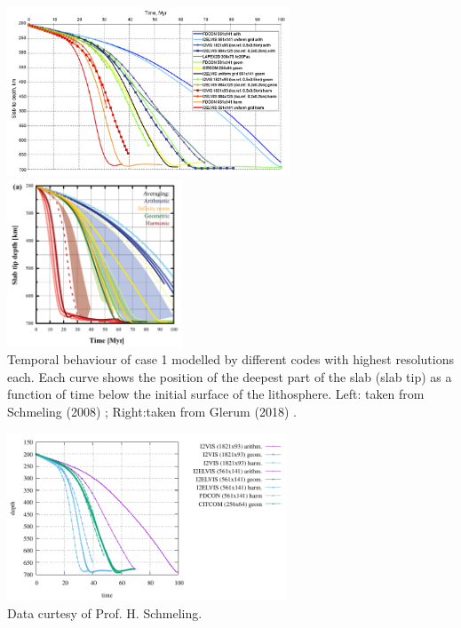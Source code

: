 \begin{center}
\includegraphics[height=5cm]{images/benchmark_scbe08/scbe08_4}
\includegraphics[height=5cm]{images/benchmark_scbe08/gltf18}\\
{\captionfont 
Temporal behaviour of case 1 modelled by different codes with highest resolutions each. 
Each curve shows the position of the deepest part of the slab (slab tip) as
a function of time below the initial surface of the lithosphere.
Left: taken from Schmeling \etal (2008) \cite{scbe08}; 
Right:taken from Glerum \etal (2018) \cite{gltf18}.}
\end{center}

\begin{center}
\includegraphics[height=5cm]{images/benchmark_scbe08/scbe08/slab_tip_depth.pdf}\\
{\captionfont Data curtesy of Prof. H. Schmeling.}
\end{center}



